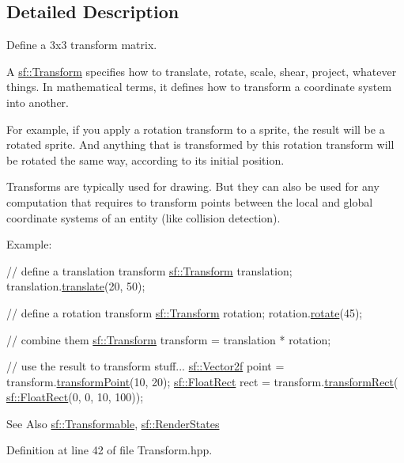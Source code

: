 \subsection{Detailed Description}
Define a 3x3 transform matrix. 

A \hyperlink{classsf_1_1_transform}{sf\-::\-Transform} specifies how to translate, rotate, scale, shear, project, whatever things. In mathematical terms, it defines how to transform a coordinate system into another.

For example, if you apply a rotation transform to a sprite, the result will be a rotated sprite. And anything that is transformed by this rotation transform will be rotated the same way, according to its initial position.

Transforms are typically used for drawing. But they can also be used for any computation that requires to transform points between the local and global coordinate systems of an entity (like collision detection).

Example\-: 
\begin{DoxyCode}
\textcolor{comment}{// define a translation transform}
\hyperlink{classsf_1_1_transform}{sf::Transform} translation;
translation.\hyperlink{classsf_1_1_transform_ab54f6c8070cc05e2afcb3145fbf4395a}{translate}(20, 50);

\textcolor{comment}{// define a rotation transform}
\hyperlink{classsf_1_1_transform}{sf::Transform} rotation;
rotation.\hyperlink{classsf_1_1_transform_a3e548c3c9e3fb9d4bd43cf852669e555}{rotate}(45);

\textcolor{comment}{// combine them}
\hyperlink{classsf_1_1_transform}{sf::Transform} transform = translation * rotation;

\textcolor{comment}{// use the result to transform stuff...}
\hyperlink{classsf_1_1_vector2}{sf::Vector2f} point = transform.\hyperlink{classsf_1_1_transform_af20913c6a27087c26192c116397ab40a}{transformPoint}(10, 20);
\hyperlink{classsf_1_1_rect}{sf::FloatRect} rect = transform.\hyperlink{classsf_1_1_transform_a345112559981d988e92b54b7976fca8a}{transformRect}(
      \hyperlink{classsf_1_1_rect}{sf::FloatRect}(0, 0, 10, 100));
\end{DoxyCode}


\begin{DoxySeeAlso}{See Also}
\hyperlink{classsf_1_1_transformable}{sf\-::\-Transformable}, \hyperlink{classsf_1_1_render_states}{sf\-::\-Render\-States} 
\end{DoxySeeAlso}


Definition at line 42 of file Transform.\-hpp.



